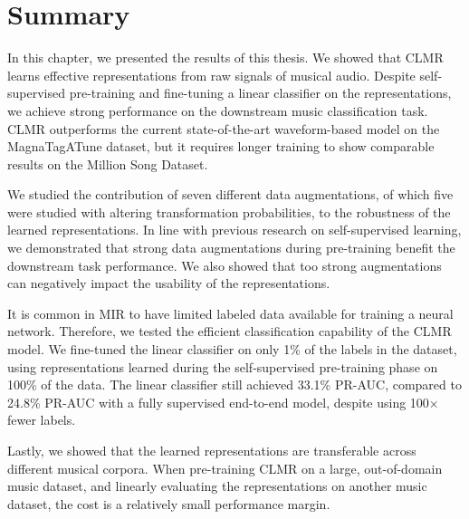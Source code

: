 \section{Summary}
In this chapter, we presented the results of this thesis. We showed that CLMR learns effective representations from raw signals of musical audio. Despite self-supervised pre-training and fine-tuning a linear classifier on the representations, we achieve strong performance on the downstream music classification task. CLMR outperforms the current state-of-the-art waveform-based model on the MagnaTagATune dataset, but it requires longer training to show comparable results on the Million Song Dataset.

We studied the contribution of seven different data augmentations, of which five were studied with altering transformation probabilities, to the robustness of the learned representations. In line with previous research on self-supervised learning, we demonstrated that strong data augmentations during pre-training benefit the downstream task performance. We also showed that too strong augmentations can negatively impact the usability of the representations.

It is common in MIR to have limited labeled data available for training a neural network. Therefore, we tested the efficient classification capability of the CLMR model. We fine-tuned the linear classifier on only 1\% of the labels in the dataset, using representations learned during the self-supervised pre-training phase on 100\% of the data. The linear classifier still achieved 33.1\% PR-AUC, compared to 24.8\% PR-AUC with a fully supervised end-to-end model, despite using 100$\times$ fewer labels.

Lastly, we showed that the learned representations are transferable across different musical corpora. When pre-training CLMR on a large, out-of-domain music dataset, and linearly evaluating the representations on another music dataset, the cost is a relatively small performance margin.